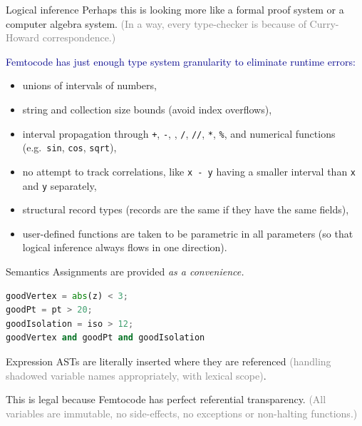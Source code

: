 \documentclass{beamer}
\begin{document}
\begin{frame}{Logical inference}
\vspace{0.25 cm}
Perhaps this is looking more like a formal proof system or a computer algebra system. \textcolor{gray}{(In a way, every type-checker is because of Curry-Howard correspondence.)}

\vspace{0.25 cm}
\textcolor{darkblue}{Femtocode has just enough type system granularity to eliminate runtime errors:}
\begin{itemize}
\item unions of intervals of numbers,
\item string and collection size bounds (avoid index overflows),
\item interval propagation through {\tt +}, {\tt -}, {\tt *}, {\tt /}, {\tt //}, {\tt **}, {\tt \%}, and numerical functions (e.g.\ {\tt sin}, {\tt cos}, {\tt sqrt}),
\item no attempt to track correlations, like {\tt x - y} having a smaller interval than {\tt x} and {\tt y} separately,
\item structural record types (records are the same if they have the same fields),
\item user-defined functions are taken to be parametric in all parameters (so that logical inference always flows in one direction).
\end{itemize}
\end{frame}

\begin{frame}[fragile]{Semantics}
\vspace{0.5 cm}
Assignments are provided {\it as a convenience.}

\begin{center}
\begin{minipage}{0.9\linewidth}
\small
\begin{lstlisting}[language=python]
goodVertex = abs(z) < 3;
goodPt = pt > 20;
goodIsolation = iso > 12;
goodVertex and goodPt and goodIsolation
\end{lstlisting}
\end{minipage}
\end{center}

Expression ASTs are literally inserted where they are referenced \textcolor{gray}{(handling shadowed variable names appropriately, with lexical scope)}.

\vspace{0.5 cm}
This is legal because Femtocode has perfect referential transparency. \textcolor{gray}{(All variables are immutable, no side-effects, no exceptions or non-halting functions.)}
\end{frame}
\end{document}
